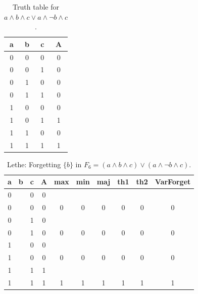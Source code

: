 \begin{table}[!tb]
    \centering
    \begin{tabular}{|c|c|c|c|}
        \hline
        \textbf{a} & \textbf{b} & \textbf{c} & \textbf{A} \\ \hline
        0 & 0 & 0 & 0 \\ \hline
        0 & 0 & 1 & 0 \\ \hline
        0 & 1 & 0 & 0 \\ \hline
        0 & 1 & 1 & 0 \\ \hline
        1 & 0 & 0 & 0 \\ \hline
        1 & 0 & 1 & 1 \\ \hline
        1 & 1 & 0 & 0 \\ \hline
        1 & 1 & 1 & 1 \\ \hline
    \end{tabular}
    \caption{Truth table for $a \land b \land c \lor a \land \lnot b \land c$.}
    \label{tab:truthtab}
\end{table}

\begin{table}[!tb]
    \centering
    \begin{tabular}{|c|c|c|c|c|c|c|c|c|c|}
        \hline
        \textbf{a} & \textbf{b} & \textbf{c} & \textbf{A} & \textbf{max} & \textbf{min} & \textbf{maj} & \textbf{th1} & \textbf{th2} & \textbf{VarForget} \\ \hline
        \rowcolor{gray!40} 0 &  & 0 & 0 &  &  &  &  &  &  \\ \hline
        \rowcolor{gray!40} 0 &  & 0 & 0 & 0 & 0 & 0 & 0 & 0 & 0 \\ \hline
        \rowcolor{blue!40} 0 &  & 1 & 0 &  &  &  &  &  &  \\ \hline
        \rowcolor{blue!40} 0 &  & 1 & 0 & 0 & 0 & 0 & 0 & 0 & 0 \\ \hline
        \rowcolor{red!40} 1 &  & 0 & 0 &  &  &  &  &  &  \\ \hline
        \rowcolor{red!40} 1 &  & 0 & 0 & 0 & 0 & 0 & 0 & 0 & 0 \\ \hline
        \rowcolor{green!40} 1 &  & 1 & 1 &  &  &  &  &  &  \\ \hline
        \rowcolor{green!40} 1 &  & 1 & 1 & 1 & 1 & 1 & 1 & 1 & 1 \\ \hline
    \end{tabular}
    \caption{Lethe: Forgetting $\{b\}$ in $F_{6} = (a \land b \land c) \lor (a \land \lnot b \land c)$.}
    \label{tab:lethe-F6-b}
\end{table}
